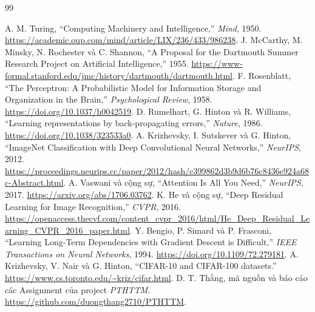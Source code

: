\documentclass[12pt,a4paper]{report}
\begin{document}
\clearpage
\begin{thebibliography}{99}
 A. M. Turing, ``Computing Machinery and Intelligence,'' \textit{Mind}, 1950. \url{https://academic.oup.com/mind/article/LIX/236/433/986238}.
 J. McCarthy, M. Minsky, N. Rochester và C. Shannon, ``A Proposal for the Dartmouth Summer Research Project on Artificial Intelligence,'' 1955. \url{https://www-formal.stanford.edu/jmc/history/dartmouth/dartmouth.html}.
 F. Rosenblatt, ``The Perceptron: A Probabilistic Model for Information Storage and Organization in the Brain,'' \textit{Psychological Review}, 1958. \url{https://doi.org/10.1037/h0042519}.
 D. Rumelhart, G. Hinton và R. Williams, ``Learning representations by back-propagating errors,'' \textit{Nature}, 1986. \url{https://doi.org/10.1038/323533a0}.
 A. Krizhevsky, I. Sutskever và G. Hinton, ``ImageNet Classification with Deep Convolutional Neural Networks,'' \textit{NeurIPS}, 2012. \url{https://proceedings.neurips.cc/paper/2012/hash/c399862d3b9d6b76c8436e924a68c-Abstract.html}.
 A. Vaswani và cộng sự, ``Attention Is All You Need,'' \textit{NeurIPS}, 2017. \url{https://arxiv.org/abs/1706.03762}.
 K. He và cộng sự, ``Deep Residual Learning for Image Recognition,'' \textit{CVPR}, 2016. \url{https://openaccess.thecvf.com/content_cvpr_2016/html/He_Deep_Residual_Learning_CVPR_2016_paper.html}.
 Y. Bengio, P. Simard và P. Frasconi, ``Learning Long-Term Dependencies with Gradient Descent is Difficult,'' \textit{IEEE Transactions on Neural Networks}, 1994. \url{https://doi.org/10.1109/72.279181}.
 A. Krizhevsky, V. Nair và G. Hinton, ``CIFAR-10 and CIFAR-100 datasets.'' \url{https://www.cs.toronto.edu/~kriz/cifar.html}.
 D. T. Thắng, mã nguồn và báo cáo các Assignment của project \textit{PTHTTM}. \url{https://github.com/duongthang2710/PTHTTM}.
\end{thebibliography}
\end{document}
